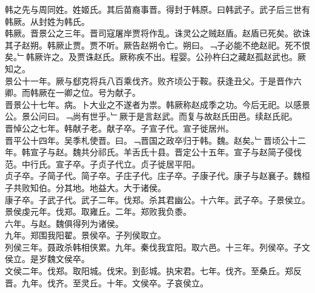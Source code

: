 \documentclass{zhvt-classic}
\begin{document}

\hspace*{2em}韩之先与周同姓。姓姬氏。其后苗裔事晋。得封于韩原。曰韩武子。武子后三世有韩厥。从封姓为韩氏。\\
\hspace*{2em}韩厥。晋景公之三年。晋司寇屠岸贾将作乱。诛灵公之贼赵盾。赵盾已死矣。欲诛其子赵朔。韩厥止贾。贾不听。厥告赵朔令亡。朔曰。﹁子必能不绝赵祀。死不恨矣。﹂韩厥许之。及贾诛赵氏。厥称疾不出。程婴。公孙杵臼之藏赵孤赵武也。厥知之。\\
\hspace*{2em}景公十一年。厥与郄克将兵八百乘伐齐。败齐顷公于鞍。获逢丑父。于是晋作六卿。而韩厥在一卿之位。号为献子。\\
\hspace*{2em}晋景公十七年。病。卜大业之不遂者为祟。韩厥称赵成季之功。今后无祀。以感景公。景公问曰。﹁尚有世乎。﹂厥于是言赵武。而复与故赵氏田邑。续赵氏祀。\\
\hspace*{2em}晋悼公之七年。韩献子老。献子卒。子宣子代。宣子徙居州。\\
\hspace*{2em}晋平公十四年。吴季札使晋。曰。﹁晋国之政卒归于韩。魏。赵矣。﹂晋顷公十二年。韩宣子与赵。魏共分祁氏。羊舌氏十县。晋定公十五年。宣子与赵简子侵伐范。中行氏。宣子卒。子贞子代立。贞子徙居平阳。\\
\hspace*{2em}贞子卒。子简子代。简子卒。子庄子代。庄子卒。子康子代。康子与赵襄子。魏桓子共败知伯。分其地。地益大。大于诸侯。\\
\hspace*{2em}康子卒。子武子代。武子二年。伐郑。杀其君幽公。十六年。武子卒。子景侯立。\\
\hspace*{2em}景侯虔元年。伐郑。取雍丘。二年。郑败我负黍。\\
\hspace*{2em}六年。与赵。魏俱得列为诸侯。\\
\hspace*{2em}九年。郑围我阳翟。景侯卒。子列侯取立。\\
\hspace*{2em}列侯三年。聂政杀韩相侠累。九年。秦伐我宜阳。取六邑。十三年。列侯卒。子文侯立。是岁魏文侯卒。\\
\hspace*{2em}文侯二年。伐郑。取阳城。伐宋。到彭城。执宋君。七年。伐齐。至桑丘。郑反晋。九年。伐齐。至灵丘。十年。文侯卒。子哀侯立。\\
\end{document}
